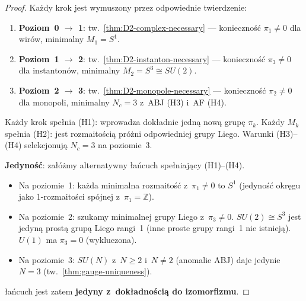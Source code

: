 \begin{proof}
Ka\.zdy krok jest wymuszony przez odpowiednie twierdzenie:
\begin{enumerate}[nosep]
  \item \textbf{Poziom~0 $\to$ 1}: tw.~\ref{thm:D2-complex-necessary}
    --- konieczno\'s\'c $\pi_1 \neq 0$ dla wir\'ow,
    minimalny $M_1 = S^1$.
  \item \textbf{Poziom~1 $\to$ 2}: tw.~\ref{thm:D2-instanton-necessary}
    --- konieczno\'s\'c $\pi_3 \neq 0$ dla instanton\'ow,
    minimalny $M_2 = S^3 \cong SU(2)$.
  \item \textbf{Poziom~2 $\to$ 3}: tw.~\ref{thm:D2-monopole-necessary}
    --- konieczno\'s\'c $\pi_2 \neq 0$ dla monopoli,
    minimalny $N_c = 3$ z~ABJ (H3) i~AF (H4).
\end{enumerate}
Ka\.zdy krok spe\l{}nia (H1): wprowadza dok\l{}adnie jedn\k{a}
now\k{a} grup\k{e} $\pi_k$. Ka\.zdy $M_k$ spe\l{}nia (H2):
jest rozmaito\'sci\k{a} pr\'o\.zni odpowiedniej grupy Liego.
Warunki (H3)--(H4) selekcjonuj\k{a} $N_c = 3$ na poziomie~3.

\textbf{Jedyno\'s\'c}: za\l{}\'o\.zmy alternatywny \l{}a\'ncuch
spe\l{}niaj\k{a}cy (H1)--(H4).
\begin{itemize}[nosep]
  \item Na poziomie~1: ka\.zda minimalna rozmaito\'s\'c z~$\pi_1 \neq 0$
    to $S^1$ (jedyno\'s\'c okr\k{e}gu jako 1-rozmaito\'sci sp\'ojnej
    z~$\pi_1 = \mathbb{Z}$).
  \item Na poziomie~2: szukamy minimalnej grupy Liego z~$\pi_3 \neq 0$.
    $SU(2) \cong S^3$ jest jedyn\k{a} prost\k{a} grup\k{a} Liego
    rangi~1 (inne proste grupy rangi~1 nie istniej\k{a}).
    $U(1)$ ma $\pi_3 = 0$ (wykluczona).
  \item Na poziomie~3: $SU(N)$ z~$N \geq 2$ i~$N \neq 2$
    (anomalie ABJ) daje jedynie $N = 3$ (tw.~\ref{thm:gauge-uniqueness}).
\end{itemize}
\l{}a\'ncuch jest zatem \textbf{jedyny z~dok\l{}adno\'sci\k{a}
do izomorfizmu}.
\end{proof}

